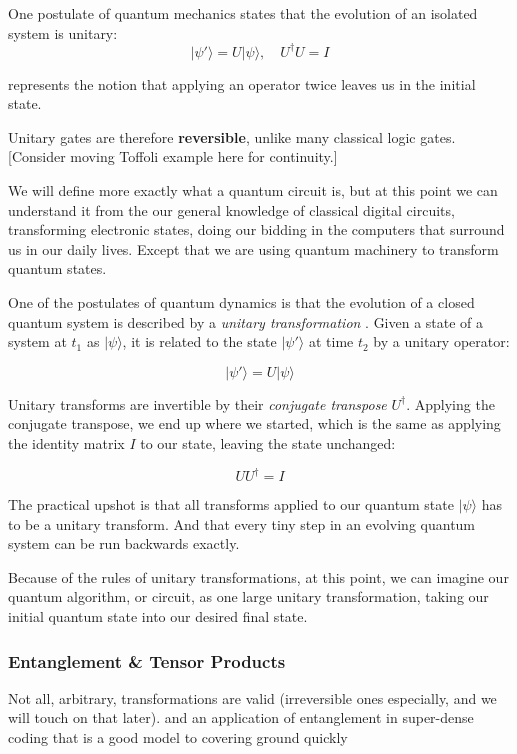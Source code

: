 One postulate of quantum mechanics states that the evolution of an isolated system is unitary:
$$ \lvert \psi'\rangle = U \lvert \psi \rangle, \quad U^{\dagger} U = I$$

represents the notion that applying an operator twice leaves us in the initial state.

Unitary gates are therefore \textbf{reversible}, unlike many classical logic gates. [Consider moving Toffoli example here for continuity.]


We will define more exactly what a quantum circuit is, 
but at this point we can understand it from the our general knowledge of classical digital circuits,
transforming electronic states, doing our bidding in the computers that surround us in our daily lives.
Except that we are using quantum machinery to transform quantum states.

One of the postulates of quantum dynamics is that the evolution of a closed quantum system is described by a
\emph{unitary transformation} \cite{Nielsen:2000}.  
Given a state of a system at $t_1$ as $|\psi\rangle$, it is related to the state $|\psi'\rangle$ at time $t_2$ 
by a unitary operator:

$$|\psi'\rangle = U|\psi\rangle$$

Unitary transforms are invertible by their \emph{conjugate transpose} $U^\dag$.  
Applying the conjugate transpose, we end up where we started, 
which is the same as applying the identity matrix $I$ to our state, leaving the state unchanged:

$$UU^\dag = I$$

The practical upshot is that all transforms applied to our quantum state $|\psi\rangle$ has to be a unitary transform.
And that every tiny step in an evolving quantum system can be run backwards exactly.

Because of the rules of unitary transformations, at this point, we can imagine our quantum algorithm, or circuit, 
as one large unitary transformation, taking our initial quantum state into our desired final state.


\subsubsection{Entanglement \& Tensor Products}

Not all, arbitrary, transformations are valid (irreversible ones especially, and we will touch on that later).
and an application of entanglement in super-dense coding that is a good model to covering ground quickly \cite{Nielsen:2010}

